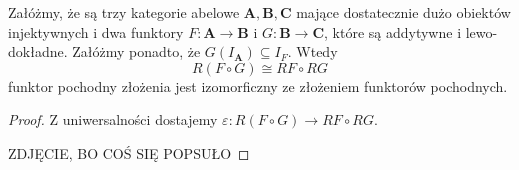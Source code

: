 \begin{theorem}
  Załóżmy, że są trzy kategorie abelowe $\mathbf{A},\mathbf{B},\mathbf{C}$ mające dostatecznie dużo obiektów injektywnych i dwa funktory $F:\mathbf{A}\to \mathbf{B}$ i $G:\mathbf{B}\to \mathbf{C}$, które są addytywne i lewo-dokładne. Załóżmy ponadto, że $G(I_\mathbf{A})\subseteq I_F$. Wtedy
  $$R(F\circ G)\cong RF\circ RG$$
  funktor pochodny złożenia jest izomorficzny ze złożeniem funktorów pochodnych.
\end{theorem}

\begin{proof}
  Z uniwersalności dostajemy $\varepsilon:R(F\circ G)\to RF\circ RG$.
  \begin{center}\end{center}
  {\large\color{red}ZDJĘCIE, BO COŚ SIĘ POPSUŁO}
\end{proof}

